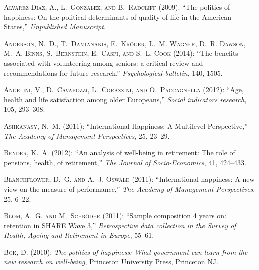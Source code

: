 \documentclass[10pt, letterpaper]{article}
\begin{document}
\begin{spacing}{1.4}
\begin{spacing}{.9}
\begin{thebibliography}{71}
\textsc{Alvarez-Diaz, A., L.~Gonzalez, and B.~Radcliff} (2009): \enquote{{The
  politics of happiness: On the political determinants of quality of life in
  the American States},} \emph{Unpublished Manuscript}.

\textsc{Anderson, N.~D., T.~Damianakis, E.~Kr{\"o}ger, L.~M. Wagner, D.~R.
  Dawson, M.~A. Binns, S.~Bernstein, E.~Caspi, and S.~L. Cook} (2014):
  \enquote{The benefits associated with volunteering among seniors: a critical
  review and recommendations for future research.} \emph{Psychological
  bulletin}, 140, 1505.

\textsc{Angelini, V., D.~Cavapozzi, L.~Corazzini, and O.~Paccagnella} (2012):
  \enquote{Age, health and life satisfaction among older Europeans,}
  \emph{Social indicators research}, 105, 293--308.

\textsc{Ashkanasy, N.~M.} (2011): \enquote{International Happiness: A
  Multilevel Perspective,} \emph{The Academy of Management Perspectives}, 25,
  23--29.

\textsc{Bender, K.~A.} (2012): \enquote{An analysis of well-being in
  retirement: The role of pensions, health, of retirement,} \emph{The Journal
  of Socio-Economics}, 41, 424--433.

\textsc{Blanchflower, D.~G. and A.~J. Oswald} (2011): \enquote{International
  happiness: A new view on the measure of performance,} \emph{The Academy of
  Management Perspectives}, 25, 6--22.

\textsc{Blom, A.~G. and M.~Schr{\"o}der} (2011): \enquote{Sample composition 4
  years on: retention in SHARE Wave 3,} \emph{Retrospective data collection in
  the Survey of Health, Ageing and Retirement in Europe}, 55--61.

\textsc{Bok, D.} (2010): \emph{The politics of happiness: What government can
  learn from the new research on well-being}, Princeton University Press,
  Princeton NJ.


\end{thebibliography}
\end{spacing}
\end{spacing}
\end{document}
